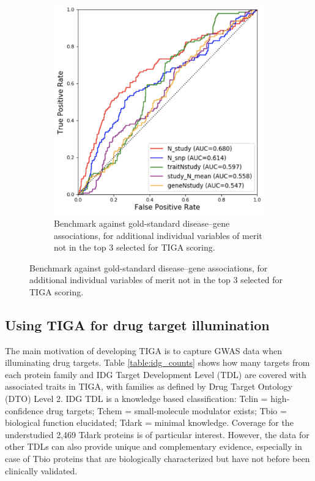 \begin{figure}
\begin{subfigure}[c]{0.5\textwidth}
	\includegraphics[width=\textwidth]{figures/tiga/SupFIG01_AdditionalROCs.png}
	\caption{Benchmark against gold-standard disease–gene associations, for additional individual variables of merit not in the top 3 selected for TIGA scoring.}
	\label{fig:TIGA_Sup01}
\end{subfigure}
\end{figure}

\subsection{Using TIGA for drug target illumination}

The main motivation of developing TIGA is to capture GWAS data when illuminating drug targets. Table \ref{table:idg_counts} shows how many targets from each protein family and IDG Target Development Level (TDL) are covered with associated traits in TIGA, with families as defined by Drug Target Ontology\cite{Lin2017-yb} (DTO) Level 2. IDG TDL is a knowledge based classification: Tclin = high-confidence drug targets; Tchem = small-molecule modulator exists; Tbio = biological function elucidated; Tdark = minimal knowledge\cite{Oprea2018-cp}. Coverage for the understudied 2,469 Tdark proteins is of particular interest. However, the data for other TDLs can also provide unique and complementary evidence, especially in case of Tbio proteins that are biologically characterized but have not before been clinically validated.


